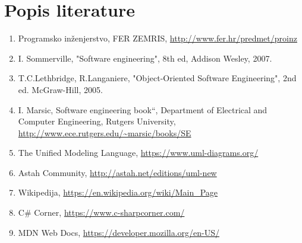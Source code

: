 \chapter*{Popis literature}
	 	
%	
%		
		
		\begin{enumerate}
			
			
			\item  Programsko inženjerstvo, FER ZEMRIS, \url{http://www.fer.hr/predmet/proinz}
			
			\item  I. Sommerville, "Software engineering", 8th ed, Addison Wesley, 2007.
			
			\item  T.C.Lethbridge, R.Langaniere, "Object-Oriented Software Engineering", 2nd ed. McGraw-Hill, 2005.
			
			\item  I. Marsic, Software engineering book``, Department of Electrical and Computer Engineering, Rutgers University, \url{http://www.ece.rutgers.edu/~marsic/books/SE}
			
			\item  The Unified Modeling Language, \url{https://www.uml-diagrams.org/}
			
			\item  Astah Community, \url{http://astah.net/editions/uml-new}
			
%			
%			
			
			\item Wikipedija, \url{https://en.wikipedia.org/wiki/Main_Page}
			
			\item C\# Corner, \url{https://www.c-sharpcorner.com/}
			
			\item MDN Web Docs, \url{https://developer.mozilla.org/en-US/}
		\end{enumerate}
		
		 
